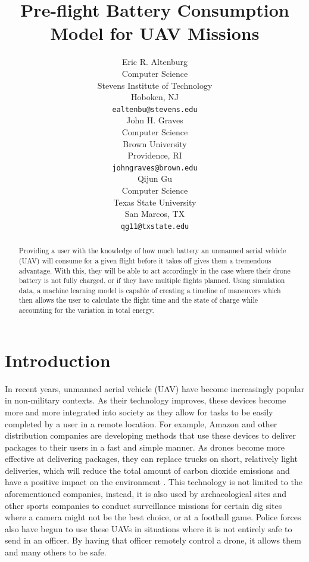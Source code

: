 \documentclass{article}
\title{Pre-flight Battery Consumption Model for UAV Missions}
\author{
Eric R. Altenburg\\
Computer Science\\
Stevens Institute of Technology\\
Hoboken, NJ \\
\texttt{ealtenbu@stevens.edu}\\
\And
John H. Graves\\
Computer Science\\
Brown University\\
Providence, RI \\
\texttt{john\textunderscore graves@brown.edu} \\
\And
Qijun Gu\\
Computer Science\\
Texas State University\\
San Marcos, TX \\
\texttt{qg11@txstate.edu}\\
}
\begin{document}
\maketitle


\begin{abstract}
Providing a user with the knowledge of how much battery an unmanned aerial vehicle (UAV) will consume for a given flight before it takes off gives them a tremendous advantage. With this, they will be able to act accordingly in the case where their drone battery is not fully charged, or if they have multiple flights planned. Using simulation data, a machine learning model is capable of creating a timeline of maneuvers which then allows the user to calculate the flight time and the state of charge while accounting for the variation in total energy.
\end{abstract}




\section{Introduction}
In recent years, unmanned aerial vehicle (UAV) have become increasingly popular in non-military contexts. As their technology improves, these devices become more and more integrated into society as they allow for tasks to be easily completed by a user in a remote location. For example, Amazon and other distribution companies are developing methods that use these devices to deliver packages to their users in a fast and simple manner. As drones become more effective at delivering packages, they can replace trucks on short, relatively light deliveries, which will reduce the total amount of carbon dioxide emissions and have a positive impact on the environment \cite{Goodchild}. This technology is not limited to the aforementioned companies, instead, it is also used by archaeological sites and other sports companies to conduct surveillance missions for certain dig sites where a camera might not be the best choice, or at a football game. Police forces also have begun to use these UAVs in situations where it is not entirely safe to send in an officer. By having that officer remotely control a drone, it allows them and many others to be safe.\par
\end{document}
